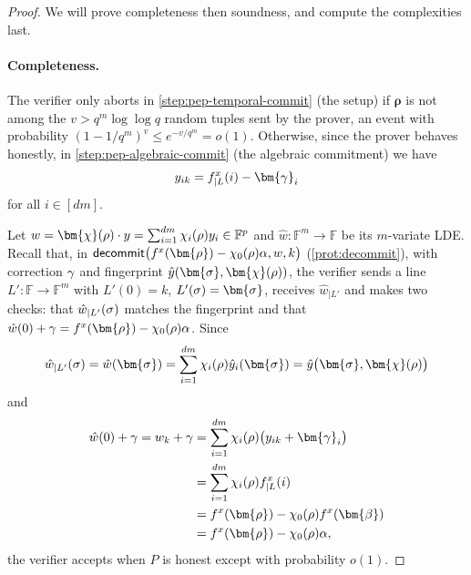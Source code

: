\documentclass[10pt,a4paper]{article}
\newif\iflipics\lipicsfalse
\theoremstyle{definition}
\newcommand{\field}{\mathbb{F}}
\newcommand{\vcommitlength}{v}
\newcommand{\pcommitlength}{p}
\newcommand{\pcommitstring}{y}
\newcommand{\dimension}{m}
\newcommand{\degree}{d}
\newcommand{\fieldsize}{q}
\newcommand{\evaluationpoint}{\bm{\fe2}}
\newcommand{\fingerprinttuple}{\bm{\rho}}
\newcommand{\Fingerprinttuple}{\bm{\sigma}}
\renewcommand{\line}{L}
\def\fe#1{
    \ifnum#1=1
        \alpha
    \else
    \ifnum#1=2
        \beta
    \else
    \ifnum#1=3
        \gamma
    \fi\fi\fi
}
\def\rfe#1{
    \ifnum#1=1
        \rho
    \else
    \ifnum#1=2
        \sigma
    \else
    \fi\fi
}
\begin{document}
\begin{proof}
    We will prove completeness then soundness, and compute the complexities last.
    
    \paragraph*{Completeness\iflipics\else.\fi} The verifier only aborts in \cref{step:pep-temporal-commit} (the setup) if $\fingerprinttuple$ is not among the $\vcommitlength > \fieldsize^\dimension \log\log \fieldsize$ random tuples sent by the prover, an event with probability $(1 - 1/\fieldsize^\dimension)^\vcommitlength \leq e^{-\vcommitlength/\fieldsize^\dimension} = o(1)$. Otherwise, since the prover behaves honestly, in \cref{step:pep-algebraic-commit} (the algebraic commitment) we have
    \begin{equation*}
        \pcommitstring_{ik} = f^x_{| \line}(i) - \bm{\fe3}_i
    \end{equation*}
    for all $i \in [\degree \dimension]$.
    
    Let $w = \bm{\chi}(\rfe1) \cdot \pcommitstring = \sum_{i = 1}^{\degree\dimension} \chi_i(\rfe1) \pcommitstring_i \in \field^\pcommitlength$ and $\hat w: \field^\dimension \to \field$ be its $\dimension$-variate LDE. Recall that, in $\textsf{decommit}\big(f^x(\fingerprinttuple) - \chi_0(\rfe1) \fe1, w, k\big)$ (\cref{prot:decommit}), with correction $\fe3$ and fingerprint $\hat \pcommitstring(\Fingerprinttuple, \bm{\chi}(\rfe1))$, the verifier sends a line $\line': \field \to \field^\dimension$ with $\line'(0) = k$, $\line'(\rfe2) = \Fingerprinttuple$, receives $\hat w_{|\line'}$ and makes two checks: that $\hat w_{|\line'}(\rfe2)$ matches the fingerprint and that $\hat w(0) + \fe3 = f^x(\fingerprinttuple) - \chi_0(\rfe1) \fe1$. Since
    \begin{equation*}
        \hat w_{|\line'}(\rfe2) = \hat w(\Fingerprinttuple) = \sum_{i = 1}^{\degree\dimension} \chi_i(\rfe1) \hat \pcommitstring_i(\Fingerprinttuple) = \hat \pcommitstring\big(\Fingerprinttuple,  \bm{\chi}(\rfe1)\big)
    \end{equation*}
    and
    \begin{align*}
        \hat w(0) + \fe3 = w_k + \fe3 &= \sum_{i = 1}^{\degree \dimension} \chi_i(\rfe1) \big(\pcommitstring_{ik} + \bm{\fe3}_i\big)\\
        &= \sum_{i = 1}^{\degree \dimension} \chi_i(\rfe1) f^x_{|\line}(i)\\
        &= f^x(\fingerprinttuple) - \chi_0(\rfe1) f^x(\evaluationpoint)\\
        &= f^x(\fingerprinttuple) - \chi_0(\rfe1) \fe1,
    \end{align*}
    the verifier accepts when $P$ is honest except with probability $o(1)$.


\end{proof}
\end{document}
